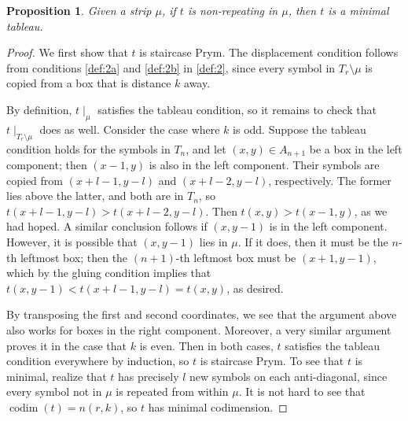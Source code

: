 \documentclass[11pt,reqno]{amsart}
\newcommand*{\restrict}[1]{{\mid}_{#1}}
\DeclareMathOperator{\codim}{codim}
\theoremstyle{definition}
\theoremstyle{problem}
\theoremstyle{plain}
\newtheorem{proposition}[definition]{Proposition}
\theoremstyle{remark}
\theoremstyle{theorem}
\numberwithin{equation}{section}
\numberwithin{figure}{section}
\begin{document}
\begin{proposition}\label{prop:18}
  Given a strip $\mu$, if $t$ is non-repeating in $\mu$, then $t$ is a
  minimal tableau.
\end{proposition}

\begin{proof}
  We first show that $t$ is staircase Prym.  The displacement
  condition  follows from conditions
  \ref{def:2a} and \ref{def:2b} in 
  \cref{def:2}, since every symbol in $T_r \setminus \mu$ is copied
  from a box that is distance $k$ away.

  By definition, $t\restrict\mu$ satisfies the tableau condition, so
  it remains to check that $t\restrict{T_r \setminus \mu}$ does as
  well.  Consider the case where $k$ is odd.  Suppose the tableau
  condition holds for the symbols in $T_n$, and let
  $(x,y) \in A_{n+1}$ be a box in the left component; then $(x-1,y)$
  is also in the left component.  Their symbols are copied from
  $(x+l-1,y-l)$ and $(x+l-2,y-l)$, respectively.  The former lies
  above the latter, and both are in $T_n$, so
  $t(x+l-1,y-l) > t(x+l-2,y-l)$.  Then $t(x,y) > t(x-1,y)$, as we had
  hoped.  A similar conclusion follows if $(x,y-1)$ is in the left
  component.  However, it is possible that $(x,y-1)$ lies in $\mu$.
  If it does, then it must be the $n$-th leftmost box; then the
  $(n+1)$-th leftmost box must be $(x+1,y-1)$, which by the gluing
  condition implies that $t(x,y-1) < t(x+l-1,y-l) = t(x,y)$, as
  desired.

  By transposing the first and second coordinates, we see that the
  argument above also works for boxes in the right component.
  Moreover, a very similar argument proves it in the case that $k$ is
  even.  Then in both cases, $t$ satisfies the tableau condition
  everywhere by induction, so $t$ is staircase Prym.  To see that $t$
  is minimal, realize that $t$ has precisely $l$ new symbols on each
  anti-diagonal, since every symbol not in $\mu$ is repeated from
  within $\mu$.  It is not hard to see that $\codim(t) = n(r,k)$, so
  $t$ has minimal codimension.
\end{proof}
\end{document}
